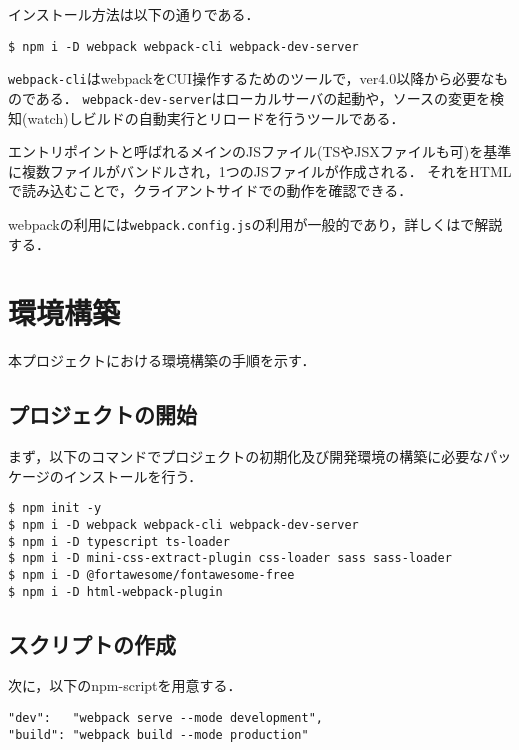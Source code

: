 \documentclass[autodetect-engine,dvi=dvipdfmx,ja=standard,
               a4j,11pt]{bxjsarticle}
\newcommand{\secref}[1]{\makebox{第~\ref{#1}~章}}
\begin{document}
インストール方法は以下の通りである．

\begin{Verbatim}[numbers=none, xleftmargin=8mm, numbersep=6pt, fontsize=\small, baselinestretch=0.8]
$ npm i -D webpack webpack-cli webpack-dev-server
\end{Verbatim}
%
\verb|webpack-cli|はwebpackをCUI操作するためのツールで，ver4.0以降から必要なものである．
\verb|webpack-dev-server|はローカルサーバの起動や，ソースの変更を検知(watch)しビルドの自動実行とリロードを行うツールである．

エントリポイントと呼ばれるメインのJSファイル(TSやJSXファイルも可)を基準に複数ファイルがバンドルされ，1つのJSファイルが作成される．
それをHTMLで読み込むことで，クライアントサイドでの動作を確認できる．

webpackの利用には\verb|webpack.config.js|の利用が一般的であり，詳しくは\secref{sec:dev-env}で解説する．

\section{環境構築} \label{sec:dev-env}

本プロジェクトにおける環境構築の手順を示す\cite{www:8}．

\subsection{プロジェクトの開始} \label{sec:projstart}

まず，以下のコマンドでプロジェクトの初期化及び開発環境の構築に必要なパッケージのインストールを行う．

\begin{Verbatim}[numbers=none, xleftmargin=8mm, numbersep=6pt, fontsize=\small, baselinestretch=0.8]
$ npm init -y
$ npm i -D webpack webpack-cli webpack-dev-server
$ npm i -D typescript ts-loader
$ npm i -D mini-css-extract-plugin css-loader sass sass-loader
$ npm i -D @fortawesome/fontawesome-free
$ npm i -D html-webpack-plugin
\end{Verbatim}

\subsection{スクリプトの作成}

次に，以下のnpm-scriptを用意する．

\begin{Verbatim}[numbers=none, xleftmargin=8mm, numbersep=6pt, fontsize=\small, baselinestretch=0.8]
"dev":   "webpack serve --mode development",
"build": "webpack build --mode production"
\end{Verbatim}
%
\end{document}
